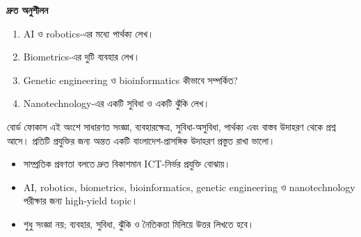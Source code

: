 \begin{practicebox}
\textbf{দ্রুত অনুশীলন}
\begin{enumerate}
\item AI ও robotics-এর মধ্যে পার্থক্য লেখ।
\item Biometrics-এর দুটি ব্যবহার লেখ।
\item Genetic engineering ও bioinformatics কীভাবে সম্পর্কিত?
\item Nanotechnology-এর একটি সুবিধা ও একটি ঝুঁকি লেখ।
\end{enumerate}
\end{practicebox}

\begin{boardbox}{বোর্ড ফোকাস}
এই অংশে সাধারণত সংজ্ঞা, ব্যবহারক্ষেত্র, সুবিধা-অসুবিধা, পার্থক্য এবং বাস্তব উদাহরণ থেকে প্রশ্ন আসে। প্রতিটি প্রযুক্তির জন্য অন্তত একটি বাংলাদেশ-প্রাসঙ্গিক উদাহরণ প্রস্তুত রাখা ভালো।
\end{boardbox}

\begin{recapbox}
\begin{itemize}
\item সাম্প্রতিক প্রবণতা বলতে দ্রুত বিকাশমান ICT-নির্ভর প্রযুক্তি বোঝায়।
\item AI, robotics, biometrics, bioinformatics, genetic engineering ও nanotechnology পরীক্ষার জন্য high-yield topic।
\item শুধু সংজ্ঞা নয়; ব্যবহার, সুবিধা, ঝুঁকি ও নৈতিকতা মিলিয়ে উত্তর লিখতে হবে।
\end{itemize}
\end{recapbox}
